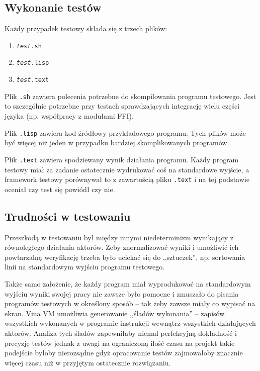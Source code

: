 \subsection{Wykonanie testów}

Każdy przypadek testowy składa się z trzech plików:

\begin{enumerate}
    \item \texttt{\emph{test}.sh}
    \item \texttt{\emph{test}.lisp}
    \item \texttt{\emph{test}.text}
\end{enumerate}

Plik \texttt{.sh} zawiera polecenia potrzebne do skompilowania programu
testowego. Jest to szczególnie potrzebne przy testach sprawdzających
integrację wielu części języka (np. współpracy z modułami FFI).

Plik \texttt{.lisp} zawiera kod źródłowy przykładowego programu. Tych plików
może być więcej niż jeden w przypadku bardziej skomplikowanych programów.

Plik \texttt{.text} zawiera spodziewany wynik działania programu. Każdy program
testowy miał za zadanie ostatecznie wydrukować coś na standardowe wyjście, a
framework testowy porównywał to z zawartością pliku \texttt{.text} i na tej
podstawie oceniał czy test się powiódł czy nie.

\subsection{Trudności w testowaniu}

Przeszkodą w testowaniu był między innymi niedeterminizm wynikający z
równoległego działania aktorów. Żeby znormalizować wyniki i umożliwić ich
powtarzalną weryfikację trzeba było uciekać się do ,,sztuczek'', np. sortowania
linii na standardowym wyjściu programu testowego.

Także samo założenie, że każdy program miał wyprodukować na standardowym wyjściu
wyniki swojej pracy nie zawsze było pomocne i zmuszało do pisania programów
testowych w określony sposób -- tak żeby zawsze miały co wypisać na ekran.
Viua VM umożliwia generowanie ,,śladów wykonania'' -- zapisów wszystkich
wykonanych w programie instrukcji wewnątrz wszystkich działających aktorów.
Analiza tych śladów zapewniłaby niemal perfekcyjną dokładność i precyzję testów 
jednak z uwagi na ograniczoną ilość czasu na projekt takie podejście byłoby
nierozsądne gdyż opracowanie testów zajmowałoby znacznie więcej czasu niż w
przyjętym ostatecznie rozwiązaniu.


